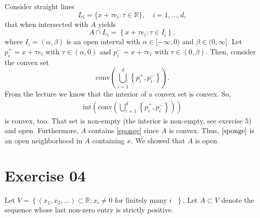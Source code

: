 \documentclass{article}
\begin{document}
\begin{enumerate}
    Consider straight lines 
    $$
        L_i = \{ x  + \tau e_i : \tau \in \mathbb{R} \}, \quad i = 1,..., d,
    $$
    that when intersected with $A$ yields 
    $$
        A \cap L_i = \left\{ x + \tau e_i : \tau \in I_i \right\},
    $$
    where $I_i = (\alpha,\beta)$ is an open interval with $\alpha \in [-\infty, 0)$ and $\beta \in (0, \infty]$. Let $p_i^+ = x + \tau e_i$ with $\tau \in (\alpha,0)$ and $p_i^- = x + \tau e_i$ with $\tau \in (0, \beta)$. Then, consider the convex set 
    $$
        \mathrm{conv}\left(
            \bigcup_{i=1}^d \left\{ p_i^+, p_i^- \right\}
        \right).
    $$
    From the lecture we know that the interior of a convex set is convex. So, 
    \begin{align}\label{sponge}
        \mathrm{int}\left( \mathrm{conv}\left(
        \bigcup_{i=1}^d \left\{ p_i^+, p_i^- \right\}
    \right)\right)
    \end{align}
    is convex, too. That set is non-empty (the interior is non-empty, see exercise 5) and open. Furthermore, $A$ contains \eqref{sponge} since $A$ is convex. Thus, $\eqref{sponge}$ is an open neighborhood in $A$ containing $x$. We showed that $A$ is open.

\end{enumerate}


\section*{Exercise 04}
Let $V = \left\{ (x_1,x_2,...) \subset \mathbb{R} : \text{$x_i \neq 0$ for finitely many $i$ } \right\}$. Let $A \subset V$ denote the sequence whose last non-zero entry is strictly positive.
\end{document}
